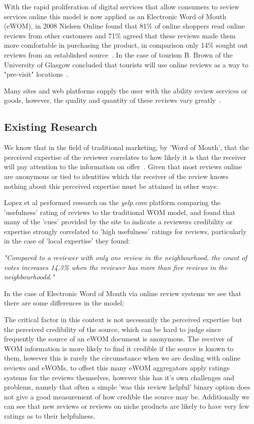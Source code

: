 With the rapid proliferation of digital services that allow consumers to review services online this model is now applied as an Electronic Word of Mouth (eWOM), in 2008 Nielsen Online found that 81\% of online shoppers read online reviews from other customers and 71\% agreed that these reviews made them more comfortable in purchasing the product, in comparison only 14\% sought out reviews from an established source~\cite{Nielsen}. In the case of tourism B. Brown of the University of Glasgow concluded that tourists will use online reviews as a way to "pre-visit" locations~\cite{Brown}.

Many sites and web platforms supply the user with the ability review services or goods, however, the quality and quantity of these reviews vary greatly~\cite{Zhang}.

\subsection{Existing Research}
We know that in the field of traditional marketing, by 'Word of Mouth', that the perceived expertise of the reviewer correlates to how likely it is that the receiver will pay attention to the information on offer~\cite{Bansal}. Given that most reviews online are anonymous or tied to identities which the receiver of the review knows nothing about this perceived expertise must be attained in other ways:

Lopez et al\cite{Lopez} performed research on the \emph{yelp.com} platform comparing the 'usefulness' rating of reviews to the traditional WOM model, and found that many of the 'cues' provided by the site to indicate a reviewers credibility or expertise strongly correlated to 'high usefulness' ratings for reviews, particularly in the case of 'local expertise' they found: 

\emph{"Compared to a reviewer with only one review in the neighbourhood, the count of votes increases 14.3\% when the reviewer has more than five reviews in the neighbourhoodd."}

In the case of Electronic Word of Mouth via online review systems we see that there are some differences in the model;

The critical factor in this context is not necessarily the perceived expertise but the perceived credibility of the source, which can be hard to judge since frequently the source of an eWOM document is anonymous. The receiver of WOM information is more likely to find it credible if the source is known to them\cite{Bart}, however this is rarely the circumstance when we are dealing with online reviews and eWOMs, to offset this many eWOM aggregators apply ratings systems for the reviews themselves\cite{Krestel}, however this has it's own challenges and problems, namely that often a simple 'was this review helpful' binary option does not give a good measurement of how credible the source may be. Additionally we can see that new reviews or reviews on niche products are likely to have very few ratings as to their helpfulness\cite{Ghose}. 

